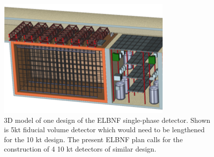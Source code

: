 \begin{figure}[!htb]
\centering
\begin{minipage}[b]{1.0\textwidth}
\begin{center}
\includegraphics[width=.75\textwidth]{./figures/fardet-3D.png}
\end{center}
\end{minipage}
\caption{\small 3D model of one design of the ELBNF single-phase detector. Shown is 5kt fiducial volume detector which would need to be lengthened for the 10 kt design. The present ELBNF plan calls for the construction of 4 10 kt detectors of similar design. }
\label{fig:fardet-overview}
\end{figure}

